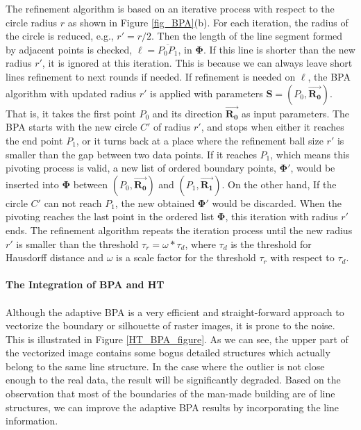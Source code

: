 \documentclass[12pt,letterpaper]{article}
\begin{document}
The refinement algorithm is based on an iterative process with respect to the circle
radius $r$ as shown in Figure \ref{fig_BPA}(b). For each iteration, the radius of
the circle is reduced, e.g., $r' = r/2$. Then the length of the line segment formed by adjacent points
is checked, $\ell = \overline{P_0P_1}$, in $\boldsymbol{\Phi}$.
If this line is shorter than the new radius $r'$, it is ignored at this iteration. This is
because we can always leave short lines refinement to next rounds if needed.
If refinement is needed on $\ell$, the BPA algorithm with updated radius $r'$
is applied with parameters $\boldsymbol{S} = (P_0, \overrightarrow{\boldsymbol{R_0}})$.
That is, it takes the first point $P_0$ and its direction $\overrightarrow{\boldsymbol{R_0}}$
as input parameters. The BPA starts with the new circle $C'$ of radius $r'$, and
stops when either it reaches the end point $P_1$, or it turns back at a place where
the refinement ball size $r'$ is smaller than the gap between two data points.
If it reaches $P_1$, which means this pivoting process is valid, a new list
of ordered boundary points, $\boldsymbol{\Phi'}$, would be inserted into
$\boldsymbol{\Phi}$ between $(P_0, \overrightarrow{\boldsymbol{R_0}})$ and
$(P_1, \overrightarrow{\boldsymbol{R_1}})$.
On the other hand, If the circle $C'$ can not reach $P_1$, the new obtained
$\boldsymbol{\Phi'}$ would be discarded.
When the pivoting reaches the last point in the ordered list $\boldsymbol{\Phi}$,
this iteration with radius $r'$ ends.
The refinement algorithm repeats the iteration process until the new radius $r'$ is
smaller than the threshold $\tau_r = \omega * \tau_d$, where $\tau_d$ is the threshold for Hausdorff distance
and $\omega$ is a scale factor for the threshold $\tau_r$ with respect to $\tau_d$.
\\
\\
\textbf{The Integration of BPA and HT}
\\
\\
Although the adaptive BPA is a very efficient and straight-forward approach to vectorize
the boundary or silhouette of raster images, it is prone to the noise. This is illustrated
in Figure \ref{HT_BPA_figure}. As we can see, the upper part of the vectorized image
contains some bogus detailed structures which actually belong to the same line structure. In the
case where the outlier is not close enough to the real data, the result will be significantly
degraded. Based on the observation that most of the boundaries of the man-made building
are of line structures, we can improve the adaptive BPA results by incorporating the line
information.
\end{document}
